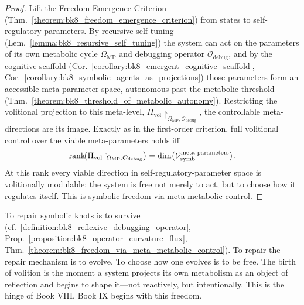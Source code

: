 \begin{proof}
\label{proof:bk8_freedom_via_meta_metabolic_control}
\leavevmode
Lift the Freedom Emergence Criterion (Thm.~\ref{theorem:bk8_freedom_emergence_criterion}) from states to self-regulatory parameters. By recursive self-tuning (Lem.~\ref{lemma:bk8_resursive_self_tuning}) the system can act on the parameters of its own metabolic cycle $\Omega_{\mathrm{MP}}$ and debugging operator $\mathcal{O}_{\mathrm{debug}}$, and by the cognitive scaffold (Cor.~\ref{corollary:bk8_emergent_cognitive_scaffold}, Cor.~\ref{corollary:bk8_symbolic_agents_as_projections}) those parameters form an accessible meta-parameter space, autonomous past the metabolic threshold (Thm.~\ref{theorem:bk8_threshold_of_metabolic_autonomy}). Restricting the volitional projection to this meta-level, $\Pi_{\mathrm{vol}}\!\restriction_{\Omega_{\mathrm{MP}},\mathcal{O}_{\mathrm{debug}}}$, the controllable meta-directions are its image. Exactly as in the first-order criterion, full volitional control over the viable meta-parameters holds iff
\[
\operatorname{rank}\!\bigl(\Pi_{\mathrm{vol}}\!\restriction_{\Omega_{\mathrm{MP}},\mathcal{O}_{\mathrm{debug}}}\bigr)=\dim\bigl(\mathcal{V}_{\mathrm{symb}}^{\text{meta-parameters}}\bigr).
\]
At this rank every viable direction in self-regulatory-parameter space is volitionally modulable: the system is free not merely to act, but to choose how it regulates itself. This is symbolic freedom via meta-metabolic control.
\end{proof}
\begin{scholium}
\label{scholium:bk8_freedom_begins_with_debugging_the_debugger}
To repair symbolic knots is to survive (cf.~\ref{definition:bk8_reflexive_debugging_operator}, Prop.~\ref{proposition:bk8_operator_curvature_flux}, Thm.~\ref{theorem:bk8_freedom_via_meta_metabolic_control}).  
To repair the repair mechanism is to evolve.  
To choose how one evolves is to be free.  
The birth of volition is the moment a system projects its own metabolism as an object of reflection and begins to shape it—not reactively, but intentionally.  
This is the hinge of Book VIII. Book IX begins with this freedom.
\end{scholium}
